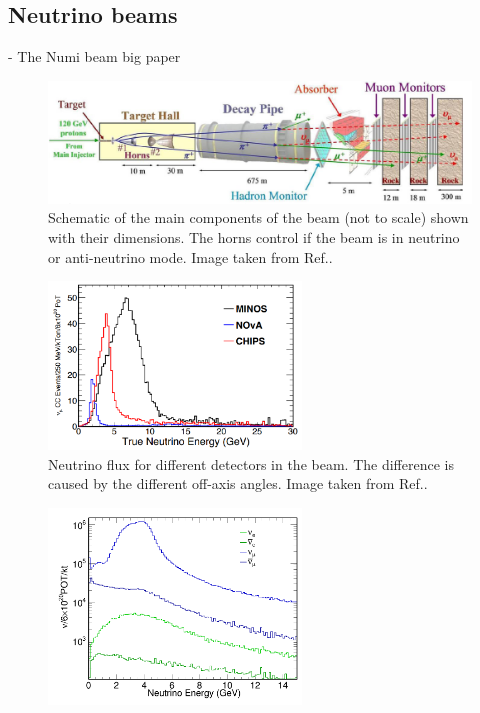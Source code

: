 \subsection{Neutrino beams} %
\label{sec:exp_long_beams} %

- The Numi beam big paper~\cite{adamson2016}

\begin{figure} %
    \includegraphics[width=\textwidth]{diagrams/4-exp/numi_beam.png}
    \caption[Schematic of the \numi beam.]
    {Schematic of the main components of the \numi beam (not to scale) shown with their
        dimensions. The horns control if the beam is in neutrino or anti-neutrino mode. Image
        taken from Ref.\cite{adamson2016}.}
    \label{fig:numi_beam}
\end{figure}

\begin{figure} %
    \includegraphics[width=0.6\textwidth]{diagrams/4-exp/numi_axis.png}
    \caption[Neutrino flux for different detectors in the \numi beam.]
    {Neutrino flux for different detectors in the \numi beam.
        The difference is caused by the different off-axis angles.
        Image taken from Ref.\cite{adamson2013}.}
    \label{fig:numi_axis}
\end{figure}

\begin{figure} %
    \includegraphics[width=0.6\textwidth]{diagrams/4-exp/flux.png}
    \caption[flux short]
    {}
    \label{fig:flux}
\end{figure}

